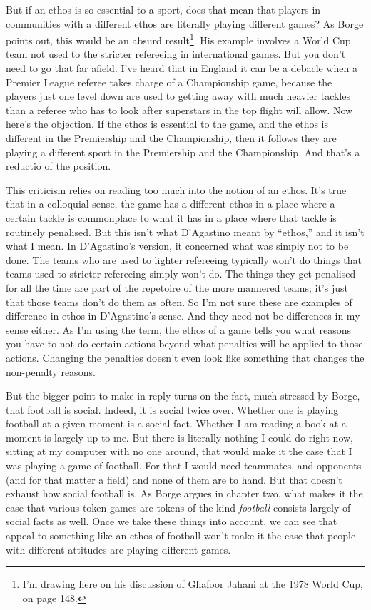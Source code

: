 \documentclass[
  12pt,
]{article}
\begin{document}
But if an ethos is so essential to a sport, does that mean that players in communities with a different ethos are literally playing different games? As Borge points out, this would be an absurd result\footnote{I'm drawing here on his discussion of Ghafoor Jahani at the 1978 World Cup, on page 148.}. His example involves a World Cup team not used to the stricter refereeing in international games. But you don't need to go that far afield. I've heard that in England it can be a debacle when a Premier League referee takes charge of a Championship game, because the players just one level down are used to getting away with much heavier tackles than a referee who has to look after superstars in the top flight will allow. Now here's the objection. If the ethos is essential to the game, and the ethos is different in the Premiership and the Championship, then it follows they are playing a different sport in the Premiership and the Championship. And that's a reductio of the position.

This criticism relies on reading too much into the notion of an ethos. It's true that in a colloquial sense, the game has a different ethos in a place where a certain tackle is commonplace to what it has in a place where that tackle is routinely penalised. But this isn't what D'Agastino meant by ``ethos,'' and it isn't what I mean. In D'Agastino's version, it concerned what was simply not to be done. The teams who are used to lighter refereeing typically won't do things that teams used to stricter refereeing simply won't do. The things they get penalised for all the time are part of the repetoire of the more mannered teams; it's just that those teams don't do them as often. So I'm not sure these are examples of difference in ethos in D'Agastino's sense. And they need not be differences in my sense either. As I'm using the term, the ethos of a game tells you what reasons you have to not do certain actions beyond what penalties will be applied to those actions. Changing the penalties doesn't even look like something that changes the non-penalty reasons.

But the bigger point to make in reply turns on the fact, much stressed by Borge, that football is social. Indeed, it is social twice over. Whether one is playing football at a given moment is a social fact. Whether I am reading a book at a moment is largely up to me. But there is literally nothing I could do right now, sitting at my computer with no one around, that would make it the case that I was playing a game of football. For that I would need teammates, and opponents (and for that matter a field) and none of them are to hand. But that doesn't exhaust how social football is. As Borge argues in chapter two, what makes it the case that various token games are tokens of the kind \emph{football} consists largely of social facts as well. Once we take these things into account, we can see that appeal to something like an ethos of football won't make it the case that people with different attitudes are playing different games.
\end{document}
